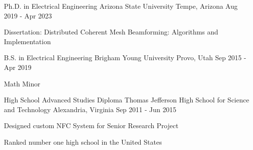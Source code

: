 

\begin{cventries}

    \cventry
    {Ph.D. in Electrical Engineering} %
    {Arizona State University} %
    {Tempe, Arizona} %
    {Aug 2019 - Apr 2023} %
    {
        \begin{cvitems} %
        \item {Dissertation: Distributed Coherent Mesh Beamforming: Algorithms and Implementation}
        \end{cvitems}
    }

    \cventry
    {B.S. in Electrical Engineering} %
    {Brigham Young University} %
    {Provo, Utah} %
    {Sep 2015 - Apr 2019} %
    {
        \begin{cvitems} %
        \item {Math Minor}
        \end{cvitems}
    }

    \cventry
    {High School Advanced Studies Diploma} %
    {Thomas Jefferson High School for Science and Technology} %
    {Alexandria, Virginia} %
    {Sep 2011 - Jun 2015} %
    {
        \begin{cvitems} %
        \item {Designed custom NFC System for Senior Research Project}
        \item {Ranked number one high school in the United States}
        \end{cvitems}
    }

\end{cventries}
